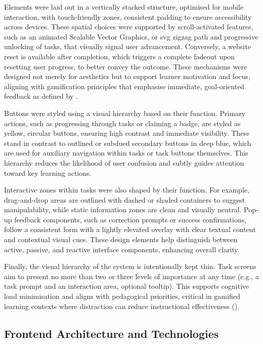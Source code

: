 Elements were laid out in a vertically stacked structure, optimised for mobile interaction, with touch-friendly zones, consistent padding to ensure accessibility across devices. 
These spatial choices were supported by scroll-activated features, such as an animated Scalable Vector Graphics, or \acrshort{svg} zigzag path and progressive unlocking of tasks, that visually signal user advancement. 
Conversely, a website reset is available after completion, which triggers a complete fadeout upon resetting user progress, to better convey the outcome. 
These mechanisms were designed not merely for aesthetics but to support learner motivation and focus, aligning with gamification principles that emphasise immediate, goal-oriented feedback as defined by \cite{redefinition}.

Buttons were styled using a visual hierarchy based on their function. 
Primary actions, such as progressing through tasks or claiming a badge, are styled as yellow, circular buttons, ensuring high contrast and immediate visibility. 
These stand in contrast to outlined or subdued secondary buttons in deep blue, which are used for auxiliary navigation within tasks or task buttons themselves. 
This hierarchy reduces the likelihood of user confusion and subtly guides attention toward key learning actions.

Interactive zones within tasks were also shaped by their function. 
For example, drag-and-drop areas are outlined with dashed or shaded containers to suggest manipulability, while static information zones are clean and visually neutral. 
Pop-up feedback components, such as correction prompts or success confirmations, follow a consistent form with a lightly elevated overlay with clear textual content and contextual visual cues. 
These design elements help distinguish between active, passive, and reactive interface components, enhancing overall clarity.

Finally, the visual hierarchy of the system is intentionally kept thin. 
Task screens aim to present no more than two or three levels of importance at any time (e.g., a task prompt and an interaction area, optional tooltip). 
This supports cognitive load minimisation and aligns with pedagogical priorities, critical in gamified learning contexts where distraction can reduce instructional effectiveness (\cite{reduceDistraction}).

\subsection{Frontend Architecture and Technologies}

